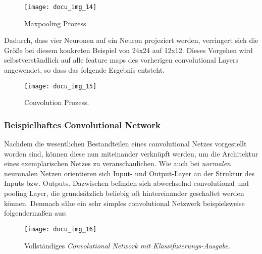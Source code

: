 \begin{figure}[h]
    \centering
    \texttt{[image: docu\_img\_14]}
    \caption{Maxpooling Prozess.}
    \label{fig:max-pooling}
\end{figure}

Dadurch, dass vier Neuronen auf ein Neuron projeziert werden, verringert sich die Größe bei diesem konkreten Beispiel
von 24x24 auf 12x12. Dieses Vorgehen wird selbstverständlich auf alle feature maps des vorherigen convolutional Layers
angewendet, so dass das folgende Ergebnis entsteht.

\begin{figure}[h]
    \centering
    \texttt{[image: docu\_img\_15]}
    \caption{Convolution Prozess.}
    \label{fig:convolution-process}
\end{figure}

\subsubsection{Beispielhaftes Convolutional Network}

Nachdem die wesentlichen Bestandteilen eines convolutional Netzes vorgestellt worden sind, können diese nun miteinander
verknüpft werden, um die Architektur eines exemplarischen Netzes zu veranschaulichen. Wie auch bei \textit{normalen} neuronalen
Netzen orientieren sich Input- und Output-Layer an der Struktur des Inputs bzw. Outputs. Dazwischen befinden sich
abwechselnd convolutional und pooling Layer, die grundsätzlich beliebig oft hintereinander geschaltet werden können.
Demnach sähe ein sehr simples convolutional Netzwerk beispielsweise folgendermaßen aus:

\begin{figure}[h]
    \centering
    \texttt{[image: docu\_img\_16]}
    \caption{Vollständiges \textit{Convolutional Network mit Klassifizierungs-Ausgabe.}}
    \label{fig:convoultional-newtork}
\end{figure}
